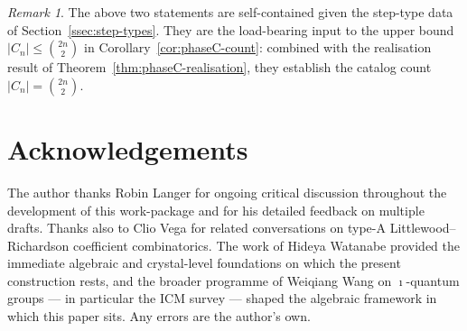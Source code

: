 \documentclass[11pt]{article}
\theoremstyle{definition}
\theoremstyle{remark}
\newtheorem{remark}[theorem]{Remark}
\begin{document}
\begin{remark}\label{rmk:appendix-self-contained}
The above two statements are self-contained given the step-type data of
Section~\ref{ssec:step-types}. They are the load-bearing input to the upper
bound $|C_n| \leq \binom{2n}{2}$ in Corollary~\ref{cor:phaseC-count}: combined
with the realisation result of Theorem~\ref{thm:phaseC-realisation}, they
establish the catalog count $|C_n| = \binom{2n}{2}$.
\end{remark}

\section*{Acknowledgements}

The author thanks Robin Langer for ongoing critical discussion throughout the
development of this work-package and for his detailed feedback on multiple
drafts. Thanks also to Clio Vega for related conversations on type-A
Littlewood--Richardson coefficient combinatorics. The work of Hideya Watanabe
\cite{Watanabe2107,Watanabe2110} provided the immediate algebraic and
crystal-level foundations on which the present construction rests, and the
broader programme of Weiqiang Wang on $\imath$-quantum groups --- in particular
the ICM survey \cite{Wang2024Survey} --- shaped the algebraic framework in
which this paper sits. Any errors are the author's own.
\end{document}
